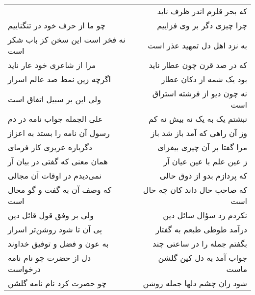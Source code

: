 \begin{center}
\begin{longtable}{l p{0.5cm} r}
&&
که بحر قلزم اندر ظرف ناید
\\
چو ما از حرف خود در تنگناییم
&&
چرا چیزی دگر بر وی فزاییم
\\
نه فخر است این سخن کز باب شکر است
&&
به نزد اهل دل تمهید عذر است
\\
مرا از شاعری خود عار ناید
&&
که در صد قرن چون عطار ناید
\\
اگرچه زین نمط صد عالم اسرار
&&
بود یک شمه از دکان عطار
\\
ولی این بر سبیل اتفاق است
&&
نه چون دیو از فرشته استراق است
\\
علی الجمله جواب نامه در دم
&&
نبشتم یک به یک نه بیش نه کم
\\
رسول آن نامه را بستد به اعزاز
&&
وز آن راهی که آمد باز شد باز
\\
دگرباره عزیزی کار فرمای
&&
مرا گفتا بر آن چیزی بیفزای
\\
همان معنی که گفتی در بیان آر
&&
ز عین علم با عین عیان آر
\\
نمی‌دیدم در اوقات آن مجالی
&&
که پردازم بدو از ذوق حالی
\\
که وصف آن به گفت و گو محال است
&&
که صاحب حال داند کان چه حال است
\\
ولی بر وفق قول قائل دین
&&
نکردم رد سؤال سائل دین
\\
پی آن تا شود روشن‌تر اسرار
&&
درآمد طوطی طبعم به گفتار
\\
به عون و فضل و توفیق خداوند
&&
بگفتم جمله را در ساعتی چند
\\
دل از حضرت چو نام نامه درخواست
&&
جواب آمد به دل کین گلشن ماست
\\
چو حضرت کرد نام نامه گلشن
&&
شود زان چشم دلها جمله روشن
\\
\end{longtable}
\end{center}
